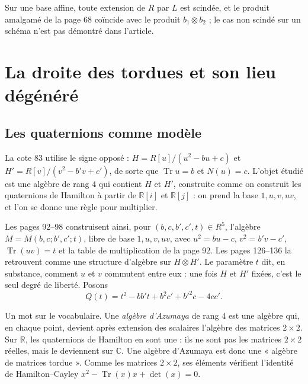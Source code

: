 \documentclass[11pt,a4paper]{amsart}
\theoremstyle{definition}
\theoremstyle{plain}
\theoremstyle{remark}
\theoremstyle{plain}
\newcommand{\Tr}{\operatorname{Tr}}
\begin{document}
Sur une base affine, toute extension de $R$ par $L$ est scindée, et le produit amalgamé de la page 68 coïncide avec le produit $b_1\otimes b_2$ ; le cas non scindé sur un schéma n'est pas démontré dans l'article.

\section{La droite des tordues et son lieu dégénéré}

\subsection{Les quaternions comme modèle}

La cote 83 utilise le signe opposé : $H = R[u]/(u^2 - bu + c)$ et $H' = R[v]/(v^2 - b'v + c')$, de sorte que $\Tr u = b$ et $N(u) = c$. L'objet étudié est une algèbre de rang $4$ qui contient $H$ et $H'$, construite comme on construit les quaternions de Hamilton à partir de $\mathbb R[i]$ et $\mathbb R[j]$ : on prend la base $1, u, v, uv$, et l'on se donne une règle pour multiplier.

Les pages 92--98 construisent ainsi, pour $(b, c, b', c', t) \in R^5$, l'algèbre $M = M(b, c; b', c'; t)$, libre de base $1, u, v, uv$, avec $u^2 = bu - c$, $v^2 = b'v - c'$, $\Tr(uv) = t$ et la table de multiplication de la page 92. Les pages 126--136 la retrouvent comme une structure d'algèbre sur $H\otimes H'$. Le paramètre $t$ dit, en substance, comment $u$ et $v$ commutent entre eux : une fois $H$ et $H'$ fixées, c'est le seul degré de liberté. Posons
\[
Q(t) = t^2 - bb't + b^2c' + b'^2c - 4cc'.
\]

Un mot sur le vocabulaire. Une \emph{algèbre d'Azumaya} de rang $4$ est une algèbre qui, en chaque point, devient après extension des scalaires l'algèbre des matrices $2\times 2$. Sur $\mathbb R$, les quaternions de Hamilton en sont une : ils ne sont pas les matrices $2\times 2$ réelles, mais le deviennent sur $\mathbb C$. Une algèbre d'Azumaya est donc une « algèbre de matrices tordue ». Comme les matrices $2\times 2$, ses éléments vérifient l'identité de Hamilton--Cayley $x^2 - \Tr(x)x + \det(x) = 0$.
\end{document}
